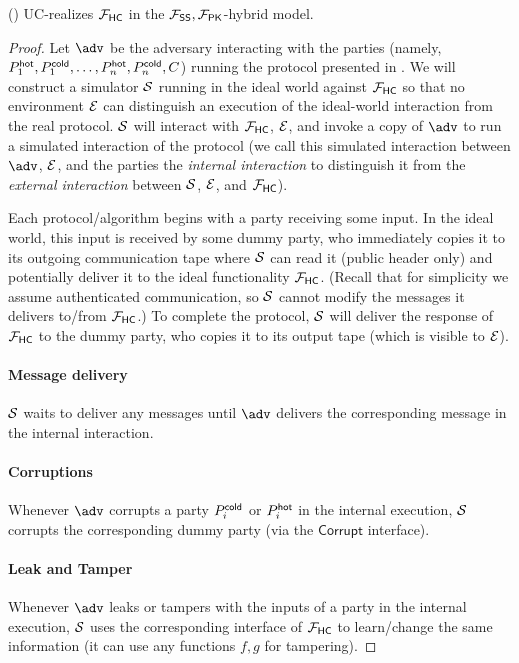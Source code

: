 \begin{theorem}\label{thm:sec}
\sysname () UC-realizes $\mathcal{F}_\mathsf{HC}$ in the $\mathcal{F}_\mathsf{SS},\mathcal{F}_\mathsf{PK}$-hybrid model.
\end{theorem}

\begin{proof}
Let $\adv$ be the adversary interacting with the parties (namely, $P_1^{\mathsf{hot}}, P_1^{\mathsf{cold}},\allowbreak \dots, P_n^{\mathsf{hot}}, P_n^{\mathsf{cold}}, C$) running the protocol presented in . We will construct a simulator $\mathcal{S}$ running in the ideal world against $\mathcal{F}_\mathsf{HC}$ so that no environment $\mathcal{E}$ can distinguish an execution of the ideal-world interaction from the real protocol. $\mathcal{S}$ will interact with $\mathcal{F}_\mathsf{HC}$, $\mathcal{E}$, and invoke a copy of $\adv$ to run a simulated interaction of the protocol (we call this simulated interaction between $\adv$, $\mathcal{E}$, and the parties the \emph{internal interaction} to distinguish it from the \emph{external interaction} between $\mathcal{S}$, $\mathcal{E}$, and $\mathcal{F}_\mathsf{HC}$).

Each protocol/algorithm begins with a party receiving some input. In the ideal world, this input is received by some dummy party, who immediately copies it to its outgoing communication tape where $\mathcal{S}$ can read it (public header only) and potentially deliver it to the ideal functionality $\mathcal{F}_\mathsf{HC}$. (Recall that for simplicity we assume authenticated communication, so $\mathcal{S}$ cannot modify the messages it delivers to/from $\mathcal{F}_\mathsf{HC}$.) To complete the protocol, $\mathcal{S}$ will deliver the response of $\mathcal{F}_\mathsf{HC}$ to the dummy party, who copies it to its output tape (which is visible to $\mathcal{E}$).

\renewcommand{\labelitemi}{\textendash}
\paragraph{Message delivery} $\mathcal{S}$ waits to deliver any messages until $\adv$ delivers the corresponding message in the internal interaction.

\paragraph{Corruptions} Whenever $\adv$ corrupts a party $P_i^{\mathsf{cold}}$ or $P_i^{\mathsf{hot}}$ in the internal execution, $\mathcal{S}$ corrupts the corresponding dummy party (via the $\mathsf{Corrupt}$ interface).

\paragraph{Leak and Tamper}
Whenever $\adv$ leaks or tampers with the inputs of a party in the internal execution, $\mathcal{S}$ uses the corresponding interface of $\mathcal{F}_\mathsf{HC}$ to learn/change the same information (it can use any functions $f,g$ for tampering). %


\end{proof}
